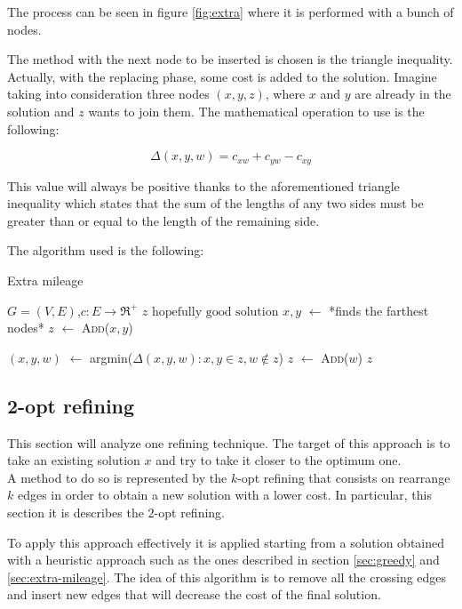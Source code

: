 The process can be seen in figure \ref{fig:extra} where it is performed with a bunch of nodes.

The method with the next node to be inserted is chosen is the triangle inequality. Actually, with the replacing phase, some cost is added to the solution. Imagine taking into consideration three nodes $(x, y, z)$, where $x$ and $y$ are already in the solution and $z$ wants to join them. The mathematical operation to use is the following:

\begin{equation}
	\Delta(x, y, w) = c_{xw} + c_{yw} - c_{xy}
\end{equation}

This value will always be positive thanks to the aforementioned triangle inequality which states that the sum of the lengths of any two sides must be greater than or equal to the length of the remaining side.

The algorithm used is the following:
\begin{algorithm}
	\caption{Extra mileage}\label{algo:extra-mileage}
	\begin{algorithmic}[1]
		\Require $G=(V,E)$,$ c:E\rightarrow \Re^+$
		\Ensure $z\text{ hopefully good solution}$
		\State $x, y$ $\gets$ *finds the farthest nodes*
		\State $z$ $\gets$ \textsc{Add($x, y$)}
		
			\State $(x, y, w)$ $\gets$ argmin($\Delta(x, y, w):x, y \in z, w \not \in z$)
			\State $z$ $\gets$ \textsc{Add($w $)}
		\EndWhile
		\State \Return $z$
	\end{algorithmic}
\end{algorithm}

\subsection{2-opt refining}
This section will analyze one refining technique. The target of this approach is to take an existing solution $x$ and try to take it closer to the optimum one.\\
A method to do so is represented by the $k$-opt refining that consists on rearrange $k$ edges in order to obtain a new solution with a lower cost. In particular, this section it is describes the $2$-opt refining.

To apply this approach effectively it is applied starting from a solution obtained with a heuristic approach such as the ones described in section \ref{sec:greedy} and \ref{sec:extra-mileage}. The idea of this algorithm is to remove all the crossing edges and insert new edges that will decrease the cost of the final solution.

